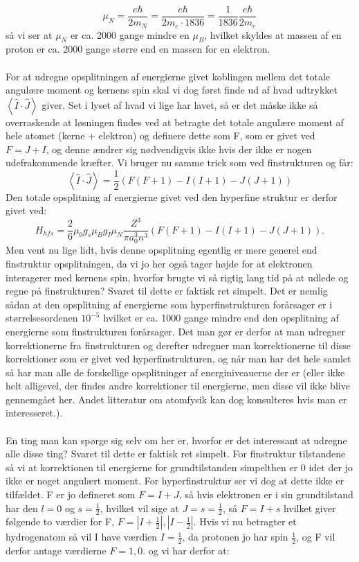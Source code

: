 \documentclass[../../Atom-ogMolekylefysik.tex]{subfiles}
\begin{document}
\begin{equation}
    \mu_N=\frac{e\hbar}{2m_N}=\frac{e\hbar}{2m_e\cdot1836}=\frac{1}{1836}\frac{e\hbar}{2m_e}
\end{equation}
så vi ser at $\mu_N$ er ca. 2000 gange mindre en $\mu_B$, hvilket skyldes at massen af en proton er ca. 2000 gange større end en massen for en elektron.\\
\\
For at udregne opsplitningen af energierne givet koblingen mellem det totale angulære moment og kernens spin skal vi dog først finde ud af hvad udtrykket $\left<\hat{I}\cdot\hat{J}\right>$ giver. Set i lyset af hvad vi lige har lavet, så er det måske ikke så overraskende at løsningen findes ved at betragte det totale angulære moment af hele atomet (kerne + elektron) og definere dette som F, som er givet ved $F=J+I$, og denne ændrer sig nødvendigvis ikke hvis der ikke er nogen udefrakommende kræfter. Vi bruger nu samme trick som ved finstrukturen og får:
\begin{equation}
    \left<\hat{I}\cdot\hat{J}\right>=\frac{1}{2}(F(F+1)-I(I+1)-J(J+1))
\end{equation}
Den totale opsplitning af energierne givet ved den hyperfine struktur er derfor givet ved:
\begin{equation}
    H_{hfs}=\frac{2}{6}\mu_0g_s\mu_Bg_I\mu_N\frac{Z^3}{\pi a_0^3n^3}(F(F+1)-I(I+1)-J(J+1)).
\end{equation}
Men vent nu lige lidt, hvis denne opsplitning egentlig er mere generel end finstruktur opsplitningen, da vi jo her også tager højde for at elektronen interagerer med kernens spin, hvorfor brugte vi så rigtig lang tid på at udlede og regne på finstrukturen? Svaret til dette er faktisk ret simpelt. Det er nemlig sådan at den opsplitning af energierne som hyperfinstrukturen forårsager er i størrelsesordenen $10^{-5}$ hvilket er ca. 1000 gange mindre end den opsplitning af energierne som finstrukturen forårsager. Det man gør er derfor at man udregner korrektionerne fra finstrukturen og derefter udregner man korrektionerne til disse korrektioner som er givet ved hyperfinstrukturen, og når man har det hele samlet så har man alle de forskellige opsplitninger af energiniveauerne der er (eller ikke helt alligevel, der findes andre korrektioner til energierne, men disse vil ikke blive gennemgået her. Andet litteratur om atomfysik kan dog konsulteres hvis man er interesseret.).\\
\\
En ting man kan spørge sig selv om her er, hvorfor er det interessant at udregne alle disse ting? Svaret til dette er faktisk ret simpelt. For finstruktur tilstandene så vi at korrektionen til energierne for grundtilstanden simpelthen er 0 idet der jo ikke er noget angulært moment. For hyperfinstruktur ser vi dog at dette ikke er tilfældet. F er jo defineret som $F=I+J$, så hvis elektronen er i sin grundtilstand har den $l=0$ og $s=\frac{1}{2}$, hvilket vil sige at $J=s=\frac{1}{2}$, så $F=I+s$ hvilket giver følgende to værdier for F, $F=|I+\frac{1}{2}|,|I-\frac{1}{2}|$. Hvis vi nu betragter et hydrogenatom så vil I have værdien $I=\frac{1}{2}$, da protonen jo har spin $\frac{1}{2}$, og F vil derfor antage værdierne $F=1,0$. og vi har derfor at:
\end{document}
